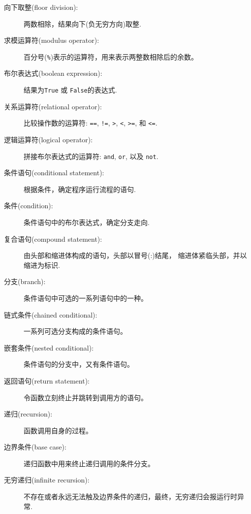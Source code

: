 \documentclass[10pt]{book}
\begin{document}
\begin{description}

\item[向下取整(floor division):] 两数相除，结果向下(负无穷方向)取整.

\item[求模运算符(modulus operator):]  百分号({\tt \%})表示的运算符，用来表示两整数相除后的余数。

\item[布尔表达式(boolean expression):]  结果为{\tt True} 或 {\tt False}的表达式.

\item[关系运算符(relational operator):] 比较操作数的运算符: {\tt ==}, {\tt !=}, {\tt >}, {\tt <}, {\tt >=}, 和 {\tt <=}.

\item[逻辑运算符(logical operator):]  拼接布尔表达式的运算符: {\tt and}, {\tt or}, 以及 {\tt not}.

\item[条件语句(conditional statement):]  根据条件，确定程序运行流程的语句.

\item[条件(condition):] 条件语句中的布尔表达式，确定分支走向.

\item[复合语句(compound statement):]  由头部和缩进体构成的语句，头部以冒号(:)结尾，
缩进体紧临头部，并以缩进为标识.

\item[分支(branch):] 条件语句中可选的一系列语句中的一种。

\item[链式条件(chained conditional):] 一系列可选分支构成的条件语句。

\item[嵌套条件(nested conditional):]  条件语句的分支中，又有条件语句。

\item[返回语句(return statement):] 令函数立刻终止并跳转到调用方的语句。

\item[递归(recursion):]  函数调用自身的过程。

\item[边界条件(base case):]  递归函数中用来终止递归调用的条件分支。

\item[无穷递归(infinite recursion):]  不存在或者永远无法触及边界条件的递归，最终，无穷递归会报运行时异常.

\end{description}
\end{document}
